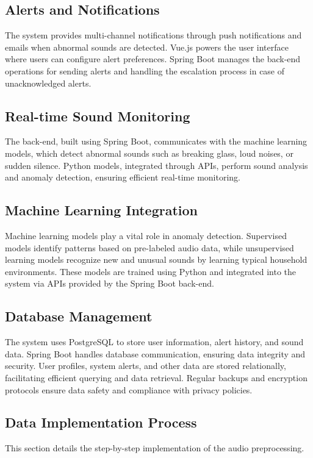 \documentclass[conference]{IEEEtran}
\begin{document}
\subsection{Alerts and Notifications}
The system provides multi-channel notifications through push notifications and emails when abnormal sounds are detected. Vue.js powers the user interface where users can configure alert preferences. Spring Boot manages the back-end operations for sending alerts and handling the escalation process in case of unacknowledged alerts.

\subsection{Real-time Sound Monitoring}
 The back-end, built using Spring Boot, communicates with the machine learning models, which detect abnormal sounds such as breaking glass, loud noises, or sudden silence. Python models, integrated through APIs, perform sound analysis and anomaly detection, ensuring efficient real-time monitoring.


\subsection{Machine Learning Integration}
Machine learning models play a vital role in anomaly detection. Supervised models identify patterns based on pre-labeled audio data, while unsupervised learning models recognize new and unusual sounds by learning typical household environments. These models are trained using Python and integrated into the system via APIs provided by the Spring Boot back-end.

\subsection{Database Management}
The system uses PostgreSQL to store user information, alert history, and sound data. Spring Boot handles database communication, ensuring data integrity and security. User profiles, system alerts, and other data are stored relationally, facilitating efficient querying and data retrieval. Regular backups and encryption protocols ensure data safety and compliance with privacy policies.

\subsection{Data Implementation Process}
This section details the step-by-step implementation of the audio preprocessing.
\end{document}
